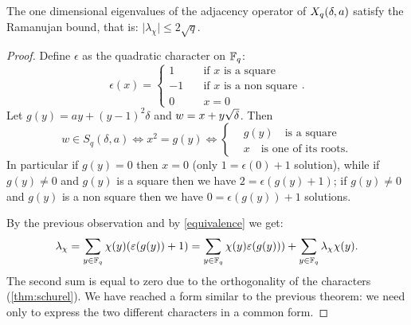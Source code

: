 \begin{cor}
	The one dimensional eigenvalues of the adjacency operator of $X_q (\delta ,a)$ satisfy the Ramanujan bound, that is:
	$\vert \lambda_{\chi} \vert \le 2\sqrt{q}$.
\begin{proof}
	Define $\epsilon$ as the quadratic character on ${\mathbb F}_q$:
\begin{equation*}
	\epsilon (x)=\begin{cases}1& \quad \text{if $x$ is a square}\\ -1& \quad \text{if $x$ is a non square}\\ 0& \quad x=0 \end{cases}.
\end{equation*}
Let $g(y)=ay+(y-1)^2 \delta$ and $w=x+y\sqrt{\delta}$. Then
\begin{equation}\label{equivalence}
w \in S_q(\delta,a) \iff x^2=g(y) \iff
\begin{cases} &g(y)\quad \text{is a square} \\ &x \quad \text{is one of its roots}.\end{cases}
\end{equation}
In particular if $g(y)=0$ then $x=0$ (only $1=\epsilon(0)+1$ solution), while if $g(y)\neq 0$ and $g(y)$ is a square then we have
$2=\epsilon (g(y)+1)$; if $g(y)\neq 0$ and $g(y)$ is a non square then we have $0=\epsilon (g(y))+1$ solutions.

By the previous observation and by \ref{equivalence} we get:
\begin{equation}
\lambda_{\chi}=\sum_{y \in {\mathbb F}_q} \chi (y)(\varepsilon(g(y))+1)=
\sum_{y \in {\mathbb F}_q}\chi (y)\varepsilon(g(y)))+\sum_{y \in {\mathbb F}_q}\lambda_{\chi}\chi (y).
\end{equation}
The second sum is equal to zero due to the orthogonality of the characters (\ref{thm:schurel}).
We have reached a form similar to the previous theorem: we need only to express the two different characters in a common form.


\end{proof}
\end{cor}
